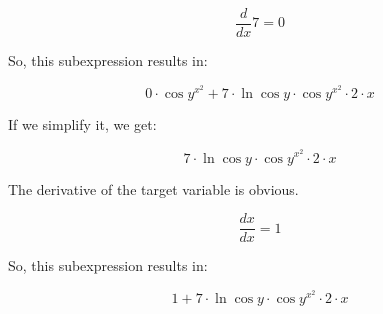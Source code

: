 \documentclass[12pt]{article}
\begin{document}
$$ \frac{d}{dx} 7 = 0 $$

So, this subexpression results in:

$$  0  \cdot \cos  y ^{ x ^{ 2 }} +  7  \cdot \ln \cos  y  \cdot \cos  y ^{ x ^{ 2 }} \cdot  2  \cdot  x  $$

If we simplify it, we get:

$$  7  \cdot \ln \cos  y  \cdot \cos  y ^{ x ^{ 2 }} \cdot  2  \cdot  x  $$

The derivative of the target variable is obvious.

$$ \frac{dx}{dx} = 1 $$

So, this subexpression results in:

$$  1  +  7  \cdot \ln \cos  y  \cdot \cos  y ^{ x ^{ 2 }} \cdot  2  \cdot  x  $$
\end{document}
